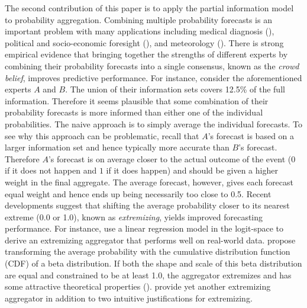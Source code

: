 \documentclass[11pt,twoside]{article}
\begin{document}
The second contribution of this paper is to apply the partial information model to probability aggregation. Combining multiple probability forecasts is an important problem with many applications including medical diagnosis (\citet{wilson1998prediction, pepe2003statistical}), political and socio-economic foresight (\citet{tetlock2005expert}), and meteorology (\citet{sanders1963subjective, vislocky1995improved, baars2005performance}). There is strong empirical evidence that bringing together the strengths of different experts by combining their probability forecasts into a single consensus, known as the \textit{crowd belief},  improves predictive performance. For instance, consider the aforementioned experts $A$ and $B$. The union of their information sets covers 12.5\% of the full information. Therefore it seems plausible that some combination of their probability forecasts is more informed than either one of the individual probabilities. The naive approach is to simply average the individual forecasts. To see why this approach can be problematic, recall that $A$'s forecast is based on a larger information set and hence typically more accurate than $B$'s forecast. Therefore $A$'s forecast is on average closer to the actual outcome of the event ($0$ if it does not happen and $1$ if it does happen) and should be given a higher weight in the final aggregate.  The average forecast, however, gives each forecast equal weight and hence ends up being necessarily too close to 0.5. Recent developments suggest that shifting the average probability closer to its nearest extreme (0.0 or 1.0), known as \textit{extremizing}, yields improved forecasting performance. For instance, \citet{satopaa} use a linear regression model in the logit-space to derive an extremizing aggregator that performs well on real-world data. \citet{Ranjan08} propose transforming the average probability with the cumulative distribution function (CDF) of a beta distribution. If both the shape and scale of this beta distribution are equal and constrained to be at least 1.0,  the aggregator extremizes and has some attractive theoretical properties (\cite{Wallsten2001}).  \citet{Baron} provide yet another extremizing aggregator in addition to two intuitive justifications for extremizing.
\end{document}
